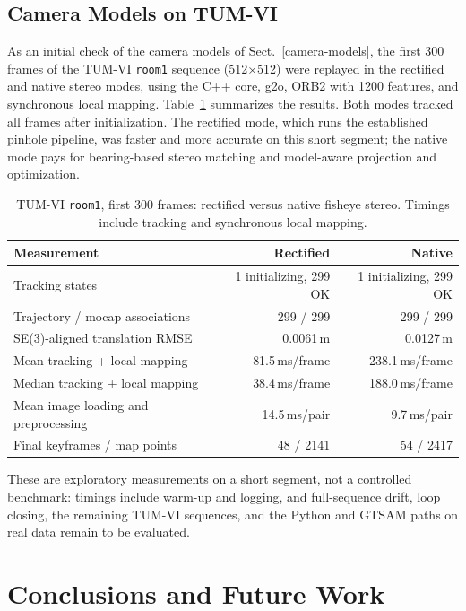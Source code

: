 \documentclass{article}
\begin{document}
\hypertarget{camera-model-validation}{%
\subsection{Camera Models on TUM-VI}\label{camera-model-validation}}

As an initial check of the camera models of Sect.~\ref{camera-models}, the first 300 frames of the TUM-VI \texttt{room1} sequence (512$\times$512) were replayed in the rectified and native stereo modes, using the C++ core, g2o, ORB2 with 1200 features, and synchronous local mapping. Table~\ref{tab:tumvi_modes} summarizes the results. Both modes tracked all frames after initialization. The rectified mode, which runs the established pinhole pipeline, was faster and more accurate on this short segment; the native mode pays for bearing-based stereo matching and model-aware projection and optimization.

\begin{table}[!ht]
\centering
\caption{TUM-VI \texttt{room1}, first 300 frames: rectified versus native fisheye stereo. Timings include tracking and synchronous local mapping.}
\label{tab:tumvi_modes}
\fontsize{8pt}{9.6pt}\selectfont
\begin{tabular}{lrr}
\toprule
Measurement & Rectified & Native \\
\midrule
Tracking states & 1 initializing, 299 OK & 1 initializing, 299 OK \\
Trajectory / mocap associations & 299 / 299 & 299 / 299 \\
SE(3)-aligned translation RMSE & 0.0061\,m & 0.0127\,m \\
Mean tracking + local mapping & 81.5\,ms/frame & 238.1\,ms/frame \\
Median tracking + local mapping & 38.4\,ms/frame & 188.0\,ms/frame \\
Mean image loading and preprocessing & 14.5\,ms/pair & 9.7\,ms/pair \\
Final keyframes / map points & 48 / 2141 & 54 / 2417 \\
\bottomrule
\end{tabular}
\end{table}

These are exploratory measurements on a short segment, not a controlled benchmark: timings include warm-up and logging, and full-sequence drift, loop closing, the remaining TUM-VI sequences, and the Python and GTSAM paths on real data remain to be evaluated.

\hypertarget{conclusions}{%
\section{Conclusions and Future Work}\label{conclusions}}
\end{document}
